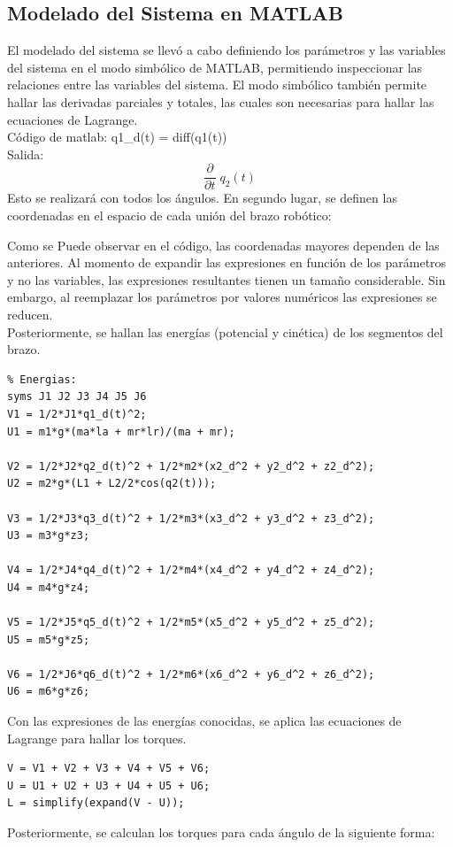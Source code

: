 \documentclass[conference]{IEEEtran}
\begin{document}
\subsection{Modelado del Sistema en MATLAB}
El modelado del sistema se llevó a cabo definiendo los parámetros y las variables del sistema en el modo simbólico de MATLAB, permitiendo inspeccionar las relaciones entre las variables del sistema. El modo simbólico también permite hallar las derivadas parciales y totales, las cuales son necesarias para hallar las ecuaciones de Lagrange.\\
Código de matlab: q1\_d(t) = diff(q1(t))\\
Salida: $$\frac{\partial }{\partial t}\;q_2 \left(t\right)$$
Esto se realizará con todos los ángulos.
En segundo lugar, se definen las coordenadas en el espacio de cada unión del brazo robótico:


Como se Puede observar en el código, las coordenadas mayores dependen de las anteriores. Al momento de expandir las expresiones en función de los parámetros y no las variables, las expresiones resultantes tienen un tamaño considerable. Sin embargo, al reemplazar los parámetros por valores numéricos las expresiones se reducen. \\
Posteriormente, se hallan las energías (potencial y cinética) de los segmentos del brazo. 
\begin{lstlisting}
% Energias: 
syms J1 J2 J3 J4 J5 J6
V1 = 1/2*J1*q1_d(t)^2;
U1 = m1*g*(ma*la + mr*lr)/(ma + mr);

V2 = 1/2*J2*q2_d(t)^2 + 1/2*m2*(x2_d^2 + y2_d^2 + z2_d^2);
U2 = m2*g*(L1 + L2/2*cos(q2(t)));

V3 = 1/2*J3*q3_d(t)^2 + 1/2*m3*(x3_d^2 + y3_d^2 + z3_d^2);
U3 = m3*g*z3;

V4 = 1/2*J4*q4_d(t)^2 + 1/2*m4*(x4_d^2 + y4_d^2 + z4_d^2);
U4 = m4*g*z4;

V5 = 1/2*J5*q5_d(t)^2 + 1/2*m5*(x5_d^2 + y5_d^2 + z5_d^2);
U5 = m5*g*z5;

V6 = 1/2*J6*q6_d(t)^2 + 1/2*m6*(x6_d^2 + y6_d^2 + z6_d^2);
U6 = m6*g*z6;
\end{lstlisting}
Con las expresiones de las energías conocidas, se aplica las ecuaciones de Lagrange para hallar los torques.
\begin{lstlisting}
V = V1 + V2 + V3 + V4 + V5 + V6;
U = U1 + U2 + U3 + U4 + U5 + U6;
L = simplify(expand(V - U));
\end{lstlisting}
Posteriormente, se calculan los torques para cada ángulo de la siguiente forma:\\
\end{document}
